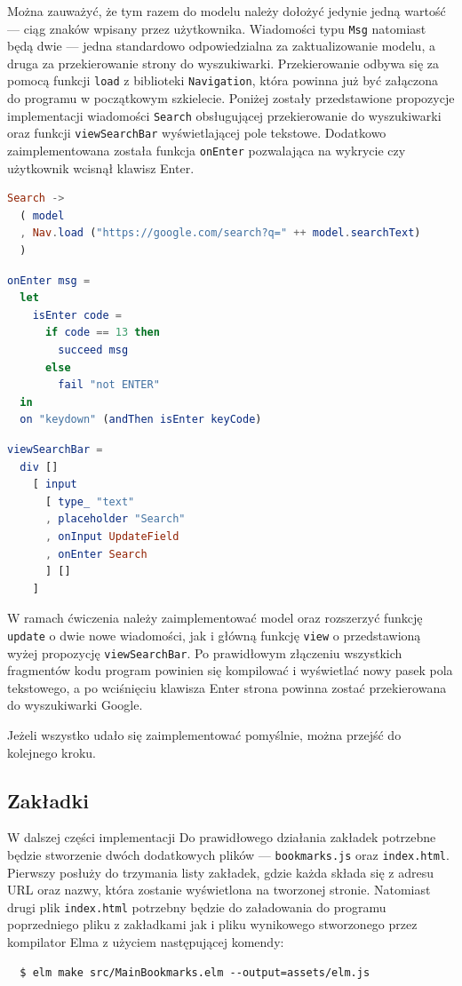 \documentclass[twoside,a4paper]{report}
\begin{document}
Można zauważyć, że tym razem do modelu należy dołożyć jedynie jedną wartość --- ciąg znaków wpisany przez użytkownika.
Wiadomości typu \texttt{Msg} natomiast będą dwie --- jedna standardowo odpowiedzialna za zaktualizowanie modelu, a druga za przekierowanie strony do wyszukiwarki.
Przekierowanie odbywa się za pomocą funkcji \texttt{load} z biblioteki \texttt{Navigation}, która powinna już być załączona do programu w początkowym szkielecie.
Poniżej zostały przedstawione propozycje implementacji wiadomości \texttt{Search} obsługującej przekierowanie do wyszukiwarki oraz funkcji \texttt{viewSearchBar} wyświetlającej pole tekstowe.
Dodatkowo zaimplementowana została funkcja \texttt{onEnter} pozwalająca na wykrycie czy użytkownik wcisnął klawisz Enter.
\begin{lstlisting}[language=Elm]
Search ->
  ( model
  , Nav.load ("https://google.com/search?q=" ++ model.searchText)
  )
\end{lstlisting}
\begin{minipage}{.56\textwidth}
\begin{lstlisting}[language=Elm]
onEnter msg =
  let
    isEnter code =
      if code == 13 then
        succeed msg
      else
        fail "not ENTER"
  in
  on "keydown" (andThen isEnter keyCode)
\end{lstlisting}
\end{minipage}\hfill
\begin{minipage}{.38\textwidth}
\begin{lstlisting}[language=Elm]
viewSearchBar =
  div []
    [ input
      [ type_ "text"
      , placeholder "Search"
      , onInput UpdateField
      , onEnter Search
      ] []
    ]
\end{lstlisting}
\end{minipage}\hfill

W ramach ćwiczenia należy zaimplementować model oraz rozszerzyć funkcję \texttt{update} o dwie nowe wiadomości, jak i główną funkcję \texttt{view} o przedstawioną wyżej propozycję \texttt{viewSearchBar}.
Po prawidłowym złączeniu wszystkich fragmentów kodu program powinien się kompilować i wyświetlać nowy pasek pola tekstowego, a po wciśnięciu klawisza Enter strona powinna zostać przekierowana do wyszukiwarki Google.

Jeżeli wszystko udało się zaimplementować pomyślnie, można przejść do kolejnego kroku.

\subsection{Zakładki}
W dalszej części implementacji
Do prawidłowego działania zakładek potrzebne będzie stworzenie dwóch dodatkowych plików --- \texttt{bookmarks.js} oraz \texttt{index.html}.
Pierwszy posłuży do trzymania listy zakładek, gdzie każda składa się z adresu URL oraz nazwy, która zostanie wyświetlona na tworzonej stronie.
Natomiast drugi plik \texttt{index.html} potrzebny będzie do załadowania do programu poprzedniego pliku z zakładkami jak i pliku wynikowego stworzonego przez kompilator Elma z użyciem następującej komendy:
\begin{lstlisting}
  $ elm make src/MainBookmarks.elm --output=assets/elm.js
\end{lstlisting}
\end{document}
